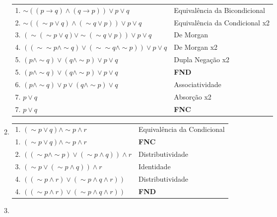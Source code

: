 \documentclass[12pt, a4paper,final]{article}
\begin{document}
\begin{enumerate}
\begin{enumerate}[label=(\alph*), leftmargin = 5mm]
                \begin{tabular}{ll}
                    1. $\sim ((p \rightarrow q) \wedge (q \rightarrow p)) \vee p \vee q$ & Equivalência da Bicondicional \\
                    2. $\sim ((\sim p \vee q) \wedge (\sim q \vee p)) \vee p \vee q$ & Equivalência da Condicional x2 \\
                    3. $(\sim (\sim p \vee q) \vee \sim(\sim q \vee p)) \vee p \vee q$ & De Morgan \\
                    4. $((\sim \sim p \wedge \sim q) \vee (\sim \sim q \wedge \sim p)) \vee p \vee q$ & De Morgan x2 \\
                    5. $(p \wedge \sim q) \vee (q \wedge \sim p) \vee p \vee q$ & Dupla Negação x2 \\
                    5. $(p \wedge \sim q) \vee (q \wedge \sim p) \vee p \vee q$ & \textbf{FND} \\
                    6. $(p \wedge \sim q) \vee p \vee (q \wedge \sim p) \vee q$ & Associatividade \\
                    7. $p \vee q$ & Absorção x2 \\
                    7. $p \vee q$ & \textbf{FNC}
                \end{tabular}
            
            \item 
            
                \begin{tabular}{ll}
                    1. $(\sim p \vee q) \wedge \sim p \wedge r$ & Equivalência da Condicional \\
                    1. $(\sim p \vee q) \wedge \sim p \wedge r$ & \textbf{FNC} \\
                    2. $((\sim p \wedge \sim p) \vee (\sim p \wedge q)) \wedge r$ & Distributividade \\
                    3. $(\sim p \vee (\sim p \wedge q)) \wedge r$ & Identidade \\
                    4. $((\sim p \wedge r) \vee (\sim p \wedge q \wedge r))$ & Distributividade \\
                    4. $((\sim p \wedge r) \vee (\sim p \wedge q \wedge r))$ & \textbf{FND} \\
                     
                \end{tabular}
            
            \item 
            

\end{enumerate}
\end{enumerate}
\end{document}

